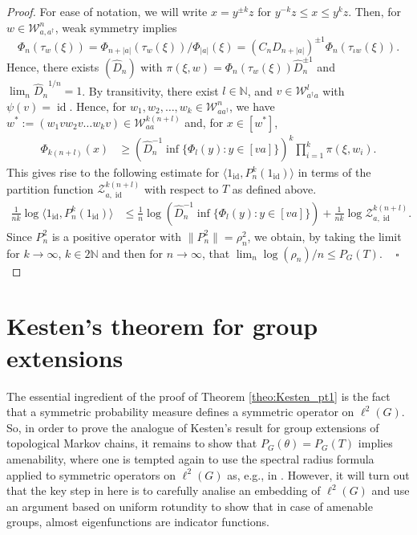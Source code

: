 \documentclass[10pt]{article}
\theoremstyle{mystyle}
\newcommand{\N}{\mathbb{N}}
\newcommand{\cZ}{\mathcal{Z}}
\newcommand{\cW}{\mathcal{W}}
\newcommand{\te}{{\theta}}
\newcommand{\1}{\mathbf{1}}
\newcommand{\with}{:}
\DeclareMathOperator{\id}{id}
\begin{document}
\begin{proof}
 For ease of notation, we will write $x=y^{\pm k }z$ for $y^{- k }z\leq x \leq y^{ k }z $. Then, for $w \in \cW^{n}_{a,a^\dagger}$, weak symmetry  implies
\[ \Phi_n(\tau_w(\xi))  = \Phi_{n+|a|}(\tau_w(\xi))/\Phi_{|a|}(\xi) 
=  (C_nD_{n+|a|})^{\pm 1} \Phi_n(\tau_{\iota w}(\xi)).\]
Hence, there exists $(\widehat{D}_n)$ with $\pi{(\xi,w)} = \Phi_n(\tau_w(\xi)) \widehat{D}_n^{\pm 1}$ and  $\lim_{n} {\widehat{D}_n}^{1/n} =1$.  
By transitivity, there exist $l \in \N$, and $v \in \cW^{l}_{a^\dagger a}$ with $\psi(v)=\id$. Hence, for $w_1, w_2, \ldots, w_k \in \cW_{a a^\dagger}^n$, we have 
$w^\ast := (w_1  v w_2 v \ldots w_k v) \in  \cW^{k(n+l)}_{aa}$ and, for $x \in [w^\ast]$, 
\begin{align*} \Phi_{k(n+l)}(x) & \geq \left( \widehat{D}_{n}^{-1} \inf\{\Phi_l(y)\with y \in [va] \}\right)^{k} \prod_{i=1}^k\pi{(\xi,w_i)}. 
 \end{align*}
This gives rise to the following estimate for $\langle 1_{\id}, P_n^k(1_{\id}) \rangle$ in terms of the partition function $\cZ_{a,\id}^{k(n+l)}$ with respect to $T$ as defined above. 
\begin{align*}
 \frac{1}{nk} \log \langle 1_{\id}, P_n^k(1_{\id}) \rangle  & \leq   \frac{1}{n}  \log \left(\widehat{D}_n^{-1}  \inf\{\Phi_l(y)\with y \in [va] \} \right) +    \frac{1}{nk} \log  \cZ_{a,\id}^{k(n+l)}.
\end{align*}
Since $P^2_n$ is a positive operator with $\|P^2_n\| = \rho_n^2$, we obtain, 
by taking the limit for $k \to \infty$, $k \in 2\N$ and then for $n \to \infty$, that $\lim_n \log (\rho_n)/n \leq P_G(T)$.
~ \hfill $\square$ \end{proof}

\section{Kesten's theorem for group extensions}

The essential ingredient of the proof of Theorem \ref{theo:Kesten_pt1} is the fact that a symmetric probability measure defines a symmetric operator on $\ell^2(G)$. So, in order to prove the analogue of Kesten's result for group extensions of topological Markov chains, it remains to show that $P_G(\te)=P_G(T)$ implies amenability, where one is tempted again to use the spectral radius formula applied to symmetric operators on $\ell^2(G)$ as, e.g., in  \cite[p. 478]{KaimanovichVershik:1983}. 
However, it will turn out that the key step in here is to carefully analise an embedding of $\ell^2(G)$ and use an argument based on uniform rotundity to show that in case of amenable groups, almost eigenfunctions are indicator functions.
\end{document}

